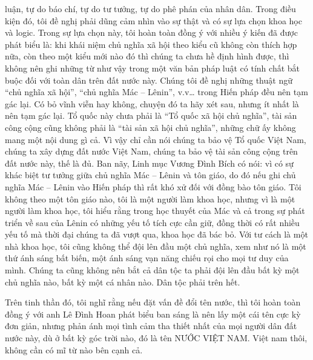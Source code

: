 luận, tự do báo chí, tự do tư tưởng, tự do phê phán của nhân dân. Trong điều kiện đó, tôi đề nghị phải dũng cảm nhìn vào sự thật và có sự lựa chọn khoa học và logic. Trong sự lựa chọn này, tôi hoàn toàn đồng ý với nhiều ý kiến đã được phát biểu là: khi khái niệm chủ nghĩa xã hội theo kiểu cũ không còn thích hợp nữa, còn theo một kiểu mới nào đó thì chúng ta chưa hề định hình được, thì không nên ghi những từ như vậy trong một văn bản pháp luật có tính chất bắt buộc đối với toàn dân trên đất nước này. Chúng tôi đề nghị những thuật ngữ “chủ nghĩa xã hội”, “chủ nghĩa Mác – Lênin”, v.v… trong Hiến pháp đều nên tạm gác lại. Có bỏ vĩnh viễn hay không, chuyện đó ta hãy xét sau, nhưng ít nhất là nên tạm gác lại. Tổ quốc này chưa phải là “Tổ quốc xã hội chủ nghĩa”, tài sản công cộng cũng không phải là “tài sản xã hội chủ nghĩa”, những chữ ấy không mang một nội dung gì cả. Vì vậy chỉ cần nói chúng ta bảo vệ Tổ quốc Việt Nam, chúng ta xây dựng đất nước Việt Nam, chúng ta bảo vệ tài sản công cộng trên đất nước này, thế là đủ. Ban nãy, Linh mục Vương Đình Bích có nói: vì có sự khác biệt tư tưởng giữa chủ nghĩa Mác – Lênin và tôn giáo, do đó nếu ghi chủ nghĩa Mác – Lênin vào Hiến pháp thì rất khó xử đối với đồng bào tôn giáo. Tôi không theo một tôn giáo nào, tôi là một người làm khoa học, nhưng vì là một người làm khoa học, tôi hiểu rằng trong học thuyết của Mác và cả trong sự phát triển về sau của Lênin có những yếu tố tích cực cần giữ, đồng thời có rất nhiều yếu tố mà thời đại chúng ta đã vượt qua, khoa học đã bác bỏ. Với tư cách là một nhà khoa học, tôi cũng không thể đội lên đầu một chủ nghĩa, xem như nó là một thứ ánh sáng bất biến, một ánh sáng vạn năng chiếu rọi cho mọi tư duy của mình. Chúng ta cũng không nên bắt cả dân tộc ta phải đội lên đầu bất kỳ một chủ nghĩa nào, bất kỳ một cá nhân nào. Dân tộc phải trên hết.

Trên tinh thần đó, tôi nghĩ rằng nếu đặt vấn đề đổi tên nước, thì tôi hoàn toàn đồng ý với anh Lê Đình Hoan phát biểu ban sáng là nên lấy một cái tên cực kỳ đơn giản, nhưng phản ánh mọi tình cảm tha thiết nhất của mọi người dân đất nước này, dù ở bất kỳ góc trời nào, đó là tên NƯỚC VIỆT NAM. Việt nam thôi, không cần có mĩ từ nào bên cạnh cả.

